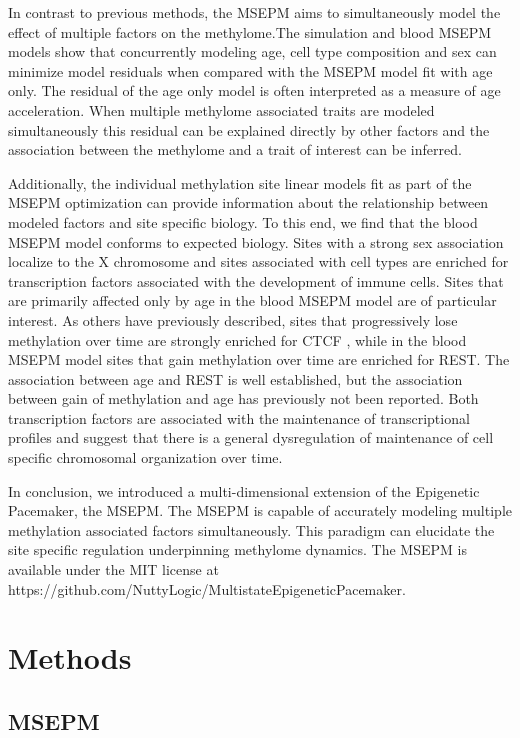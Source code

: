 \documentclass{article}
\begin{document}
{\begin{linenumbers}
In contrast to previous methods, the MSEPM aims to simultaneously model the effect of multiple factors on the 
methylome.The simulation and blood MSEPM models show that concurrently modeling age, cell type composition and sex 
can minimize  model residuals when compared with the MSEPM model fit with age only. The residual of the age only 
model is often interpreted as a measure of age acceleration. When multiple methylome associated traits are modeled 
simultaneously this residual can be explained directly by other factors and the association between the methylome 
and a trait of interest can be inferred. 

Additionally, the individual methylation site linear models fit as part of the MSEPM optimization can provide 
information about the relationship between modeled factors and site specific biology.  To this end, we find that 
the blood MSEPM model conforms to expected biology. Sites with a strong sex association localize to the X chromosome 
and sites associated with cell types are enriched for transcription factors associated with the development of 
immune cells. Sites that are primarily affected only by age in the blood MSEPM model are of particular interest. 
As others have previously described, sites that progressively lose methylation over time are strongly enriched for 
CTCF \cite{Han2020-zj,De_Lima_Camillo2022-lu}, while in the blood MSEPM model sites that gain methylation over time 
are enriched for REST. The association between age and REST is well established, but the association between gain of 
methylation and age has previously not been reported. Both transcription factors are associated with the maintenance 
of transcriptional profiles and suggest that there is a general dysregulation of maintenance of cell specific 
chromosomal organization over time.

In conclusion, we introduced a multi-dimensional extension of the Epigenetic Pacemaker, the MSEPM. The MSEPM is 
capable of accurately modeling multiple methylation associated factors simultaneously. This paradigm can elucidate 
the site specific regulation underpinning methylome dynamics. The MSEPM is available under the MIT license at
 https://github.com/NuttyLogic/MultistateEpigeneticPacemaker. 

\section{Methods}

\subsection{MSEPM}


\end{linenumbers}}
\end{document}
